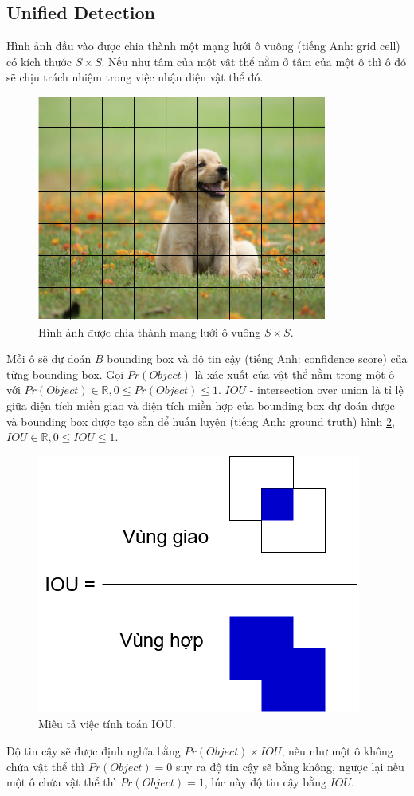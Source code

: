 \subsection{Unified Detection}
Hình ảnh đầu vào được chia thành một mạng lưới ô vuông (tiếng Anh: grid cell) có kích thước $S \times S$. Nếu như tâm của một vật thể nằm ở tâm của một ô thì ô đó sẽ chịu trách nhiệm trong việc nhận diện vật thể đó.
\begin{figure}[ht!]
	\centerline{\includegraphics[scale=0.6]{images/grid_cell.png}}
  	\caption{Hình ảnh được chia thành mạng lưới ô vuông $S \times S$.}
  	\label{fig:grid_cell}
\end{figure}
Mỗi ô sẽ dự đoán $B$ bounding box và độ tin cậy (tiếng Anh: confidence score) của từng bounding box. Gọi $Pr(Object)$ là xác xuất của vật thể nằm trong một ô với $Pr(Object) \in \mathbb{R}, 0 \leq Pr(Object) \leq 1$. $IOU$ - intersection over union là tỉ lệ giữa diện tích miền giao và diện tích miền hợp của bounding box dự đoán được và bounding box được tạo sẵn để huấn luyện (tiếng Anh: ground truth) hình \ref{fig:iou}, $IOU \in \mathbb{R}, 0 \leq IOU \leq 1$.
\begin{figure}[ht!]
	\centerline{\includegraphics[scale=0.6]{images/iou.png}}
  	\caption{Miêu tả việc tính toán IOU.}
  	\label{fig:iou}
\end{figure}
Độ tin cậy sẽ được định nghĩa bằng $Pr(Object) \times IOU$, nếu như một ô không chứa vật thể thì $Pr(Object)=0$ suy ra độ tin cậy sẽ bằng không, ngược lại nếu một ô chứa vật thể thì $Pr(Object)=1$, lúc này độ tin cậy bằng $IOU$.

